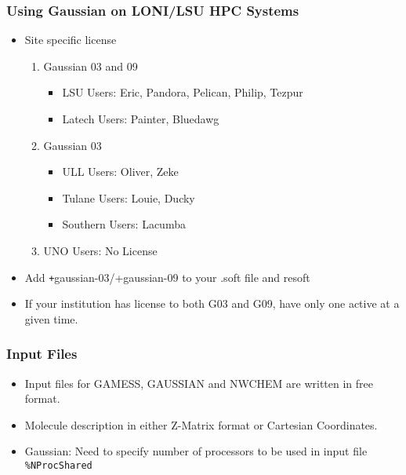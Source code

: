 \documentclass[slidestop,mathserif,compress,xcolor=svgnames]{beamer}
\begin{document}
\begin{frame}
\frametitle{\small Using Gaussian on LONI/LSU HPC Systems}
\begin{itemize}
\item Site specific license%
\begin{enumerate}
 \item {\color{tigersblue}Gaussian 03 and 09}
\begin{itemize}
 \item {\color{tigersblue}LSU Users}: Eric, {\color{green!30!black}Pandora, Pelican, Philip, Tezpur}
 \item {\color{tigersblue}Latech Users}: Painter, Bluedawg
\end{itemize}
 \item {\color{tigerspurple}Gaussian 03}
\begin{itemize}
 \item {\color{tigerspurple}ULL Users}: Oliver, Zeke
 \item {\color{tigerspurple}Tulane Users}: Louie, Ducky
 \item {\color{tigerspurple}Southern Users}: Lacumba
\end{itemize}
 \item UNO Users: No License
\end{enumerate}
\item Add {\texttt +gaussian-03/+gaussian-09} to your .soft file and resoft
\item \alert{If your institution has license to both G03 and G09, have only one active at a given time.}
\end{itemize}
\end{frame}

\begin{frame}
\frametitle{\small Input Files}
\begin{itemize}
\item Input files for GAMESS, GAUSSIAN and NWCHEM are written in free format.
\item Molecule description in either Z-Matrix format or Cartesian Coordinates.
\item Gaussian: Need to specify number of processors to be used in input file \texttt{\%NProcShared}
\end{itemize}
\end{frame}
\end{document}
